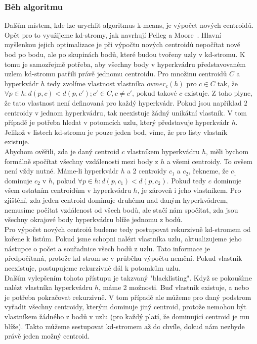 \subsubsection{Běh algoritmu}
Dalším místem, kde lze urychlit algoritmus k-means, je výpočet nových centroidů. Opět pro to využijeme kd-stromy, jak navrhují Pelleg a Moore~\cite{pelleg99}. Hlavní myšlenkou jejich optimalizace je při výpočtu nových centroidů nepočítat nové bod po bodu, ale po skupinách bodů, které budou tvořeny uzly v kd-stromu. K tomu je samozřejmě potřeba, aby všechny body v hyperkvádru představovaném uzlem kd-stromu patřili právě jednomu centroidu. Pro množinu centroidů $C$ a hyperkvádr $h$ tedy zvolíme vlastnost vlastníka $owner_c(h)$ pro $c \in C$ tak, že $\forall p \in h: d(p,c) < d(p,c'); c' \in C, c \ne c'$, pokud takové $c$ existuje. Z toho plyne, že tato vlastnost není definovaná pro každý hyperkvádr. Pokud jsou například 2 centroidy v jednom hyperkvádru, tak neexistuje žádný unikátní vlastník. V tom případě je potřeba hledat v potomcích uzlu, který představuje hyperkvádr $h$. Jelikož v listech kd-stromu je pouze jeden bod, víme, že pro listy vlastník existuje.\\

Abychom ověřili, zda je daný centroid $c$ vlastníkem hyperkvádru $h$, měli bychom formálně spočítat všechny vzdálenosti mezi body z $h$ a všemi centroidy. To ovšem není vždy nutné. Máme-li hyperkvádr $h$ a 2 centroidy $c_1$ a $c_2$, řekneme, že $c_1$ dominuje $c_2$ v $h$, pokud $\forall p \in h: d(p,c_1) < d(p,c_2)$. Pokud tedy $c$ dominuje všem ostatním centroidům v hyperkvádru $h$, je zároveň i jeho vlastníkem. Pro zjištění, zda jeden centroid dominuje druhému nad daným hyperkvádrem, nemusíme počítat vzdálenost od všech bodů, ale stačí nám spočítat, zda jsou všechny okrajové body hyperkvádru blíže jednomu z bodů.\\

Pro výpočet nových centroiů budeme tedy postupovat rekurzivně kd-stromem od kořene k listům. Pokud jsme schopni nalézt vlastníka uzlu, aktualizujeme jeho nástupce o počet a souřadnice všech bodů z uzlu. Tato informace je předpočítaná, protože kd-strom se v průběhu výpočtu nemění. Pokud vlastník neexistuje, postupujeme rekurzivně dál k potomkům uzlu.\\

Dalším vylepšením tohoto přístupu je takzvaný "blacklisting". Když se pokoušíme nalézt vlastníka hyperkvádru $h$, máme 2 možnosti. Buď vlastník existuje, a nebo je potřeba pokračovat rekurzivně. V tom případě ale můžeme pro daný podstrom vyřadit všechny centroidy, kterým dominuje jiný centroid, protože nemohou být vlastníkem žádného z bodů v uzlu (pro každý platí, že dominující centroid je mu blíže). Takto můžeme sestupovat kd-stromem až do chvíle, dokud nám nezbyde právě jeden možný centroid.\\

